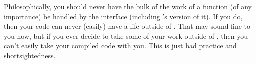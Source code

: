 Philosophically, you should never have the bulk of the work of a function (of any
importance) be handled by the \R interface (including \thispackage's version of 
it). If you do, then your code can never (easily) have a life outside of \R.  
That may sound fine to you now, but if you ever decide to take some of your 
work outside of \R, then you can't easily take your compiled code with you.  
This is just bad practice and shortsightedness.  
